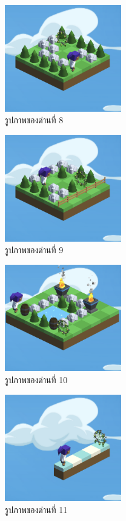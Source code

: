 \begin{figure}[H]
    \begin{center}
    \includegraphics[width=2in]{pic-toro/stage/s8.png}
    \end{center}
    \caption[รูปภาพของด่านที่ 8]{รูปภาพของด่านที่ 8}
    \label{s8}
\end{figure}
\begin{figure}[H]
    \begin{center}
    \includegraphics[width=2in]{pic-toro/stage/s9.png}
    \end{center}
    \caption[รูปภาพของด่านที่ 9]{รูปภาพของด่านที่ 9}
    \label{s9}
\end{figure}
\begin{figure}[H]
    \begin{center}
    \includegraphics[width=2in]{pic-toro/stage/s10.png}
    \end{center}
    \caption[รูปภาพของด่านที่ 10]{รูปภาพของด่านที่ 10}
    \label{s10}
\end{figure}
\begin{figure}[H]
    \begin{center}
    \includegraphics[width=2in]{pic-toro/stage/s11.png}
    \end{center}
    \caption[รูปภาพของด่านที่ 11]{รูปภาพของด่านที่ 11}
    \label{s11}
\end{figure}
